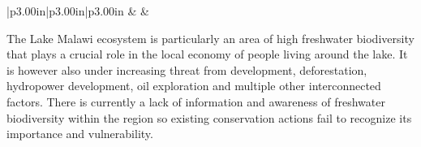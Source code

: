 \documentclass[
]{book}
\begin{document}
\begin{longtable}[c]{|p{3.00in}|p{3.00in}|p{3.00in}}
 &  &  \\




\end{longtable}

The Lake Malawi ecosystem is particularly an area of high freshwater biodiversity that plays a crucial role in the local economy of people living around the lake. It is however also under increasing threat from development, deforestation, hydropower development, oil exploration and multiple other interconnected factors. There is currently a lack of information and awareness of freshwater biodiversity within the region so existing conservation actions fail to recognize its importance and vulnerability.
\end{document}
